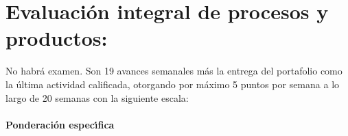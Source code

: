 \section{Evaluaci\'{o}n integral de procesos y productos:}

No habr\'{a} examen. Son 19 avances semanales m\'{a}s la entrega del
portafolio como la \'{u}ltima actividad calificada, otorgando por
m\'{a}ximo 5 puntos por semana a lo largo de 20 semanas con la
siguiente escala: 

\paragraph{Ponderaci\'{o}n espec\'{\i}fica}

\quad



